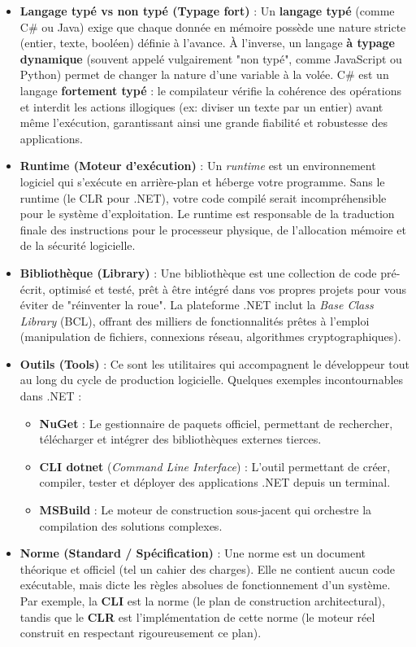 \begin{itemize}
    \item \textbf{Langage typé vs non typé (Typage fort)} : 
    Un \textbf{langage typé} (comme C\# ou Java) exige que chaque donnée en mémoire possède une nature stricte (entier, texte, booléen) définie à l'avance. À l'inverse, un langage \textbf{à typage dynamique} (souvent appelé vulgairement "non typé", comme JavaScript ou Python) permet de changer la nature d'une variable à la volée. C\# est un langage \textbf{fortement typé} : le compilateur vérifie la cohérence des opérations et interdit les actions illogiques (ex: diviser un texte par un entier) avant même l'exécution, garantissant ainsi une grande fiabilité et robustesse des applications.

    \item \textbf{Runtime (Moteur d'exécution)} : 
    Un \emph{runtime} est un environnement logiciel qui s'exécute en arrière-plan et héberge votre programme. Sans le runtime (le CLR pour .NET), votre code compilé serait incompréhensible pour le système d'exploitation. Le runtime est responsable de la traduction finale des instructions pour le processeur physique, de l'allocation mémoire et de la sécurité logicielle.

    \item \textbf{Bibliothèque (Library)} : 
    Une bibliothèque est une collection de code pré-écrit, optimisé et testé, prêt à être intégré dans vos propres projets pour vous éviter de "réinventer la roue". La plateforme .NET inclut la \emph{Base Class Library} (BCL), offrant des milliers de fonctionnalités prêtes à l'emploi (manipulation de fichiers, connexions réseau, algorithmes cryptographiques).

    \item \textbf{Outils (Tools)} : 
    Ce sont les utilitaires qui accompagnent le développeur tout au long du cycle de production logicielle. Quelques exemples incontournables dans .NET :
    \begin{itemize}
        \item \textbf{NuGet} : Le gestionnaire de paquets officiel, permettant de rechercher, télécharger et intégrer des bibliothèques externes tierces.
        \item \textbf{CLI dotnet} (\emph{Command Line Interface}) : L'outil permettant de créer, compiler, tester et déployer des applications .NET depuis un terminal.
        \item \textbf{MSBuild} : Le moteur de construction sous-jacent qui orchestre la compilation des solutions complexes.
    \end{itemize}

    \item \textbf{Norme (Standard / Spécification)} : 
    Une norme est un document théorique et officiel (tel un cahier des charges). Elle ne contient aucun code exécutable, mais dicte les règles absolues de fonctionnement d'un système. Par exemple, la \textbf{CLI} est la norme (le plan de construction architectural), tandis que le \textbf{CLR} est l'implémentation de cette norme (le moteur réel construit en respectant rigoureusement ce plan).
\end{itemize}


